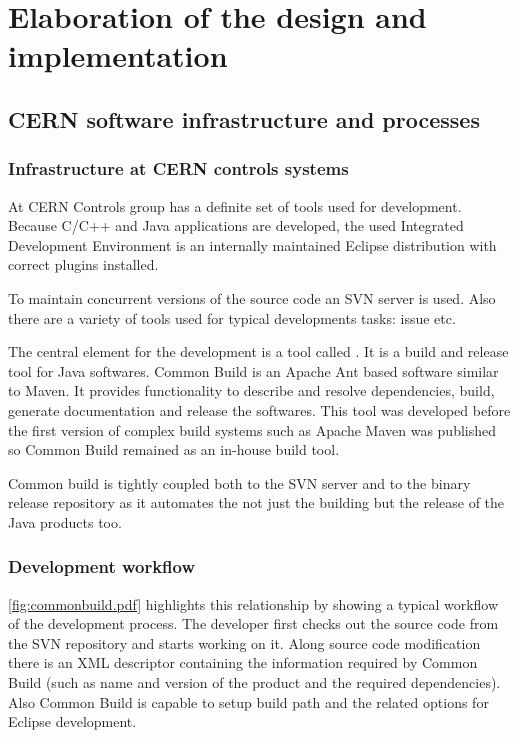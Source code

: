 \chapter{Elaboration of the design and implementation}


\section{CERN software infrastructure and processes}

\subsection{Infrastructure at CERN controls systems}

At CERN Controls group has a definite set of tools used for development. Because
C/C++ and Java applications are developed, the used Integrated Development
Environment is an internally maintained Eclipse distribution with correct
plugins installed.

To maintain concurrent versions of the source code an SVN server is used. Also
there are a variety of tools used for typical developments tasks: issue
etc. 

The central element for the development is a tool called 
\cite{CommonBuild}. It is a build and release tool for Java softwares. Common
Build is an Apache Ant based software similar to Maven. It provides
functionality to describe and resolve dependencies, build, generate
documentation and release the softwares. This tool was developed before the
first version of complex build systems such as Apache Maven was published so 
Common Build remained as an in-house build tool. 

Common build is tightly coupled both to the SVN server and to the binary release
repository as it automates the not just the building but the release of the
Java products too.

\subsection{Development workflow}
\autoref{fig:commonbuild.pdf} highlights this relationship by showing a typical
workflow of the development process. The developer first checks out the source
code from the SVN repository and starts working on it. Along source code
modification there is an XML descriptor containing the information required by
Common Build (such as name and version of the product and the required
dependencies). Also Common Build is capable to setup build path and the related
options for Eclipse development. 

